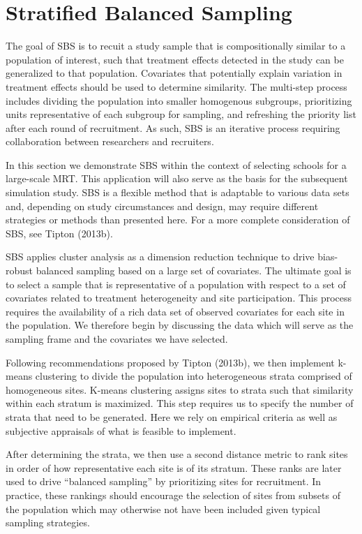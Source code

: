 \documentclass[man,floatsintext]{apa6}
\begin{document}
\hypertarget{stratified-balanced-sampling}{%
\section{Stratified Balanced Sampling}\label{stratified-balanced-sampling}}

The goal of SBS is to recuit a study sample that is compositionally similar to a population of interest, such that treatment effects detected in the study can be generalized to that population. Covariates that potentially explain variation in treatment effects should be used to determine similarity. The multi-step process includes dividing the population into smaller homogenous subgroups, prioritizing units representative of each subgroup for sampling, and refreshing the priority list after each round of recruitment. As such, SBS is an iterative process requiring collaboration between researchers and recruiters.

In this section we demonstrate SBS within the context of selecting schools for a large-scale MRT. This application will also serve as the basis for the subsequent simulation study. SBS is a flexible method that is adaptable to various data sets and, depending on study circumstances and design, may require different strategies or methods than presented here. For a more complete consideration of SBS, see Tipton (2013b).

SBS applies cluster analysis as a dimension reduction technique to drive bias-robust balanced sampling based on a large set of covariates. The ultimate goal is to select a sample that is representative of a population with respect to a set of covariates related to treatment heterogeneity and site participation. This process requires the availability of a rich data set of observed covariates for each site in the population. We therefore begin by discussing the data which will serve as the sampling frame and the covariates we have selected.

Following recommendations proposed by Tipton (2013b), we then implement k-means clustering to divide the population into heterogeneous strata comprised of homogeneous sites. K-means clustering assigns sites to strata such that similarity within each stratum is maximized. This step requires us to specify the number of strata that need to be generated. Here we rely on empirical criteria as well as subjective appraisals of what is feasible to implement.

After determining the strata, we then use a second distance metric to rank sites in order of how representative each site is of its stratum. These ranks are later used to drive \enquote{balanced sampling} by prioritizing sites for recruitment. In practice, these rankings should encourage the selection of sites from subsets of the population which may otherwise not have been included given typical sampling strategies.
\end{document}
